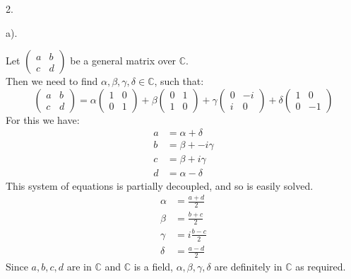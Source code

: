 \documentclass[a4paper,12pt]{article}
\begin{document}
2.
\begin{minipage}[t]{0.9\textwidth}
  a).
  \begin{minipage}[t]{\textwidth}
    Let $\left(\begin{matrix} a & b \\ c & d\end{matrix}\right)$ be a general matrix over $\mathbb{C}$.\\
    Then we need to find $\alpha, \beta, \gamma, \delta \in \mathbb{C}$, such that:
    \begin{equation*}
      \left(\begin{matrix} a & b \\ c & d\end{matrix}\right) = \alpha \left(\begin{matrix}1 & 0 \\ 0 & 1\end{matrix}\right)
        + \beta \left(\begin{matrix}0 & 1 \\ 1 & 0\end{matrix}\right) + \gamma \left(\begin{matrix}0 & -i \\ i & 0\end{matrix}\right) + \delta\left(\begin{matrix}1 & 0 \\ 0 & -1\end{matrix}\right)
    \end{equation*}
    For this we have:
    \begin{align*}
      a &= \alpha + \delta\\
      b &= \beta + -i\gamma\\
      c &= \beta  + i\gamma\\
      d &= \alpha - \delta
    \end{align*}
    This system of equations is partially decoupled, and so is easily solved.
    \begin{align*}
      \alpha  &= \frac{a + d}{2}\\
      \beta &= \frac{b + c}{2}\\
      \gamma &= i\frac{b - c}{2}\\
      \delta &= \frac{a - d}{2} 
    \end{align*}
    Since $a, b, c, d$ are in $\mathbb{C}$ and $\mathbb{C}$ is a field, $\alpha, \beta, \gamma, \delta$ are definitely in $\mathbb{C}$ as required.
  \end{minipage}
\end{minipage}
\end{document}
